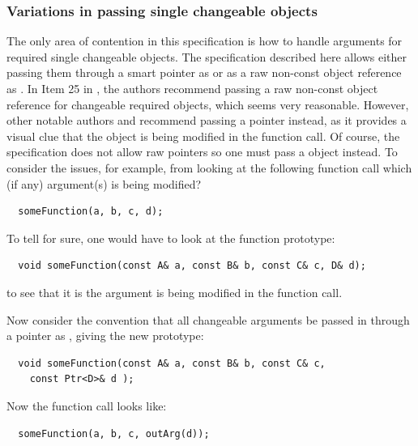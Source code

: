 \documentclass[pdf,ps2pdf,11pt]{SANDreport}
\begin{document}
%
{}\subsubsection*{Variations in passing single changeable objects}
\label{sec:vars-passing-single-objs}
%

The only area of contention in this specification is how to handle
arguments for required single changeable objects.  The specification
described here allows either passing them through a smart pointer as
{} or as a raw non-const object reference as
{}.  In Item 25 in {}\cite{C++CodingStandards05}, the authors
recommend passing a raw non-const object reference {} for
changeable required objects, which seems very reasonable.  However,
other notable authors {}\cite[Section Section 5.5]{stroustrup97} and
{}\cite[Section 13.2]{CodeComplete2nd04} recommend passing a pointer
instead, as it provides a visual clue that the object is being
modified in the function call.  Of course, the specification does not
allow raw pointers so one must pass a {} object
instead.  To consider the issues, for example, from looking at the
following function call which (if any) argument(s) is being modified?

{\small\begin{verbatim}
  someFunction(a, b, c, d);
\end{verbatim}}

To tell for sure, one would have to look at the function prototype:

{\small\begin{verbatim}
  void someFunction(const A& a, const B& b, const C& c, D& d);
\end{verbatim}}

to see that it is the {} argument is being modified in the
function call.

Now consider the convention that all changeable arguments be passed in
through a pointer as {}, giving the new
prototype:

{\small\begin{verbatim}
  void someFunction(const A& a, const B& b, const C& c,
    const Ptr<D>& d );
\end{verbatim}}

Now the function call looks like:

{\small\begin{verbatim}
  someFunction(a, b, c, outArg(d));
\end{verbatim}}
\end{document}
